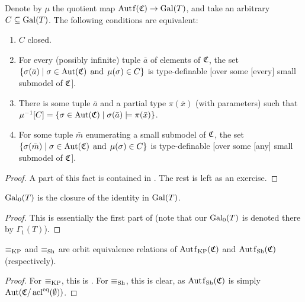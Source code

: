 	\begin{fct}\label{fct: characterization of topology on Gal_L(T)}
		Denote by $\mu$ the quotient map $\Autf(\fC)\to \Gal(T)$, and take an arbitrary $C\subseteq \operatorname{{Gal}}(T)$. The following conditions are equivalent:
		\begin{enumerate}
			\item
			$C$ closed.
			\item
			For every (possibly infinite) tuple $\bar a$ of elements of ${\mathfrak C}$, the set $\{\sigma(\bar a)\mid \sigma \in \operatorname{{Aut}}({\mathfrak C})\;\, \mbox{and}\;\, \mu(\sigma) \in C\}$ is type-definable [over some [every] small submodel of ${\mathfrak C}$].
			\item
			There is some  tuple $\bar a$ and a partial type $\pi(\bar x)$ (with parameters) such that $\mu^{-1}[C]=\{ \sigma \in \operatorname{{Aut}}({\mathfrak C})\mid \sigma(\bar a) \models \pi(\bar x)\}$.
			\item
			For some tuple $\bar m$ enumerating a small submodel of ${\mathfrak C}$, the set $\{\sigma(\bar m)\mid \sigma \in \operatorname{{Aut}}({\mathfrak C})\;\, \mbox{and}\;\, \mu(\sigma) \in C\}$ is type-definable [over some [any] small submodel of ${\mathfrak C}$].
		\end{enumerate}
	\end{fct}
	\begin{proof}
		A part of this fact is contained in \cite[Lemma 4.10]{LaPi}. The rest is left as an exercise.
	\end{proof}
	
	
	\begin{fct}
		\label{fct:galkp_quot}
		$\operatorname{{Gal}}_0(T)$ is the closure of the identity in $\operatorname{{Gal}}(T)$.
	\end{fct}
	\begin{proof}
		This is essentially the first part of \cite[Theorem 21]{Zie02} (note that our $\operatorname{{Gal}}_0(T)$ is denoted there by $\Gamma_1(T)$).
	\end{proof}
	
	\begin{fct}
		\label{fct:galkpsh_orbital}
		$\equiv_{\mathrm{KP}}$ and $\equiv_{\mathrm{Sh}}$ are orbit equivalence relations of $\Autf_\KP(\fC)$ and $\Autf_\Sh(\fC)$ (respectively).
	\end{fct}
	\begin{proof}
		For $\equiv_{\mathrm{KP}}$, this is \cite[Fact 1.4(ii)]{CLPZ01}. For $\equiv_{\mathrm{Sh}}$, this is clear, as $\Autf_\Sh(\fC)$ is simply $\operatorname{{Aut}}({\mathfrak C}/\operatorname{{acl}}^{\textrm{eq}}(\emptyset))$.
	\end{proof}

